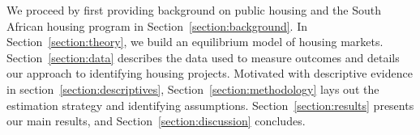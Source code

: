 \documentclass[12pt]{article}
\begin{document}


We proceed by first providing background on public housing and the South African housing program in Section~\ref{section:background}.  In Section~\ref{section:theory}, we build an equilibrium model of housing markets.  Section~\ref{section:data} describes the data used to measure outcomes and details our approach to identifying housing projects. Motivated with descriptive evidence in section~\ref{section:descriptives}, Section~\ref{section:methodology} lays out the estimation strategy and identifying assumptions. Section~\ref{section:results} presents our main results, and  Section~\ref{section:discussion} concludes.


\end{document}
